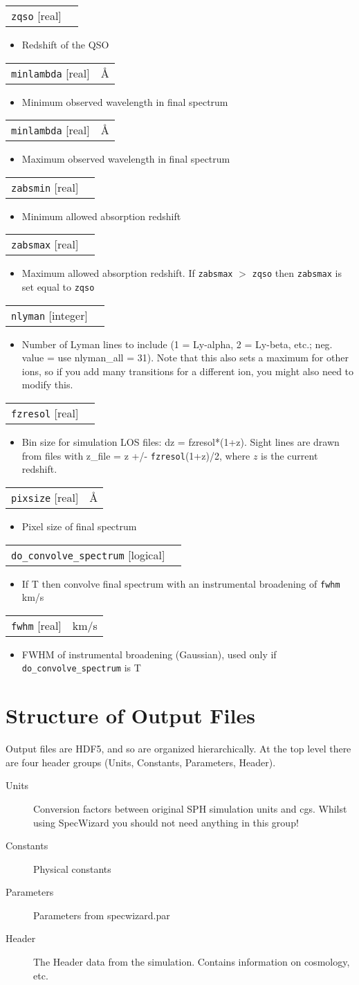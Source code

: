 \documentclass{report}
\makeatletter
\newcommand{\paramdefinition}[3]{
\begin{tabular*}{\textwidth}{l@{\extracolsep{\fill}}r}
		{\tt #1} [{\sc #2}]& #3 \\
\end{tabular*}}
\newcommand{\paramdescription}[1]{
\begin{itemize}
\item #1
\end{itemize}\vspace{0.2cm}}
\makeatother
\begin{document}
\paramdefinition{zqso}{real}{}
\paramdescription{Redshift of the QSO}

\paramdefinition{minlambda}{real}{\AA{}}
\paramdescription{Minimum observed wavelength in final spectrum}

\paramdefinition{minlambda}{real}{\AA{}}
\paramdescription{Maximum observed wavelength in final spectrum}

\paramdefinition{zabsmin}{real}{}
\paramdescription{Minimum allowed absorption redshift}

\paramdefinition{zabsmax}{real}{}
\paramdescription{Maximum allowed absorption redshift.  If {\tt zabsmax} $>$ {\tt zqso} then {\tt zabsmax} is set equal to {\tt zqso}}

\paramdefinition{nlyman}{integer}{}
\paramdescription{Number of Lyman lines to include (1 = Ly-alpha, 2 = Ly-beta, etc.; neg. value = use nlyman\_all = 31). Note that this also sets a maximum for other ions, so if you add many transitions for a different ion, you might also need to modify this.}

\paramdefinition{fzresol}{real}{}
\paramdescription{Bin size for simulation LOS files: dz = fzresol*(1+z). Sight lines are drawn from files with z\_file = z +/- {\tt fzresol}(1+z)/2, where $z$ is the current redshift.}

\paramdefinition{pixsize}{real}{\AA{}}
\paramdescription{Pixel size of final spectrum}

\paramdefinition{do\_convolve\_spectrum}{logical}{}
\paramdescription{If T then convolve final spectrum with an instrumental broadening of {\tt fwhm} km/s}

\paramdefinition{fwhm}{real}{km/s}
\paramdescription{FWHM of instrumental broadening (Gaussian), used only if {\tt do\_convolve\_spectrum} is T}


\chapter{Structure of Output Files}

Output files are HDF5, and so are organized hierarchically.  At the top level there are four header groups (Units, Constants, Parameters, Header).

\begin{description}
   \item[Units] Conversion factors between original SPH simulation units and cgs.  Whilst using SpecWizard you should not need anything in this group!
   \item[Constants] Physical constants
   \item[Parameters] Parameters from specwizard.par
   \item[Header] The Header data from the simulation.  Contains information on cosmology, etc.
\end{description}  
\end{document}
